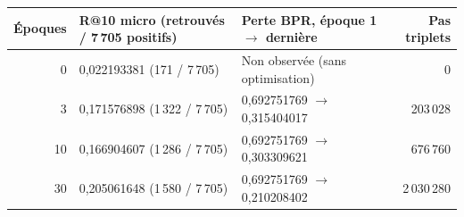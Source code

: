 \begin{tabularx}{\linewidth}{@{}rXXr@{}}
\toprule
Époques & R@10 micro (retrouvés / 7\,705 positifs) & Perte BPR, époque 1 $\rightarrow$ dernière & Pas triplets\\
\midrule
0 & 0,022193381 (171 / 7\,705) & Non observée (sans optimisation) & 0\\
3 & 0,171576898 (1\,322 / 7\,705) & 0,692751769 $\rightarrow$ 0,315404017 & 203\,028\\
10 & 0,166904607 (1\,286 / 7\,705) & 0,692751769 $\rightarrow$ 0,303309621 & 676\,760\\
30 & 0,205061648 (1\,580 / 7\,705) & 0,692751769 $\rightarrow$ 0,210208402 & 2\,030\,280\\
\bottomrule
\end{tabularx}